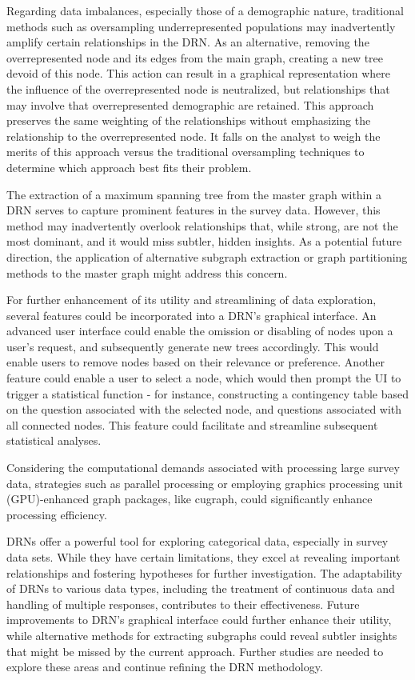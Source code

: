 Regarding data imbalances, especially those of a demographic nature, traditional methods such as oversampling underrepresented populations may inadvertently amplify certain relationships in the DRN. As an alternative, removing the overrepresented node and its edges from the main graph, creating a new tree devoid of this node. This action can result in a graphical representation where the influence of the overrepresented node is neutralized, but relationships that may involve that overrepresented demographic are retained. This approach preserves the same weighting of the relationships without emphasizing the relationship to the overrepresented node. It falls on the analyst to weigh the merits of this approach versus the traditional oversampling techniques to determine which approach best fits their problem.

The extraction of a maximum spanning tree from the master graph within a DRN serves to capture prominent features in the survey data. However, this method may inadvertently overlook relationships that, while strong, are not the most dominant, and it would miss subtler, hidden insights. As a potential future direction, the application of alternative subgraph extraction or graph partitioning methods to the master graph might address this concern.

For further enhancement of its utility and streamlining of data exploration, several features could be incorporated into a DRN's graphical interface. An advanced user interface could enable the omission or disabling of nodes upon a user's request, and subsequently generate new trees accordingly. This would enable users to remove nodes based on their relevance or preference.  Another feature could enable a user to select a node, which would then prompt the UI to trigger a statistical function - for instance, constructing a contingency table based on the question associated with the selected node, and questions associated with all connected nodes. This feature could facilitate and streamline subsequent statistical analyses.

Considering the computational demands associated with processing large survey data, strategies such as parallel processing or employing graphics processing unit (GPU)-enhanced graph packages, like cugraph\cite{cugraph}, could significantly enhance processing efficiency.

DRNs offer a powerful tool for exploring categorical data, especially in survey data sets. While they have certain limitations, they excel at revealing important relationships and fostering hypotheses for further investigation. The adaptability of DRNs to various data types, including the treatment of continuous data and handling of multiple responses, contributes to their effectiveness. Future improvements to DRN's graphical interface could further enhance their utility, while alternative methods for extracting subgraphs could reveal subtler insights that might be missed by the current approach. Further studies are needed to explore these areas and continue refining the DRN methodology.


